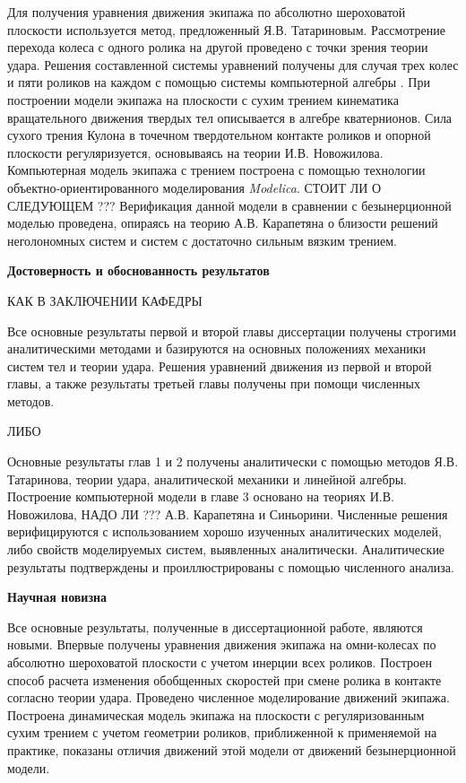 Для получения уравнения движения экипажа по абсолютно шероховатой плоскости используется метод, предложенный Я.В. Татариновым. Рассмотрение перехода колеса с одного ролика на другой проведено с точки зрения теории удара. Решения составленной системы уравнений получены для случая трех колес и пяти роликов на каждом с помощью системы компьютерной алгебры . При построении модели экипажа на плоскости с сухим трением кинематика вращательного движения твердых тел описывается в алгебре кватернионов. Сила сухого трения Кулона в точечном твердотельном контакте роликов и опорной плоскости регуляризуется, основываясь на теории И.В. Новожилова. Компьютерная модель экипажа с трением построена с помощью технологии объектно-ориентированного моделирования \textit{Modelica}. СТОИТ ЛИ О СЛЕДУЮЩЕМ ??? Верификация данной модели в сравнении с безынерционной моделью проведена, опираясь на теорию А.В. Карапетяна о близости решений неголономных систем и систем с достаточно сильным вязким трением.

\textbf{Достоверность и обоснованность результатов}

КАК В ЗАКЛЮЧЕНИИ КАФЕДРЫ

Все основные результаты первой и второй главы диссертации получены строгими аналитическими методами и базируются на основных положениях механики систем тел и теории удара. Решения уравнений движения из первой и второй главы, а также результаты третьей главы получены при помощи численных методов.

ЛИБО

Основные результаты глав 1 и 2 получены аналитически с помощью методов Я.В. Татаринова, теории удара, аналитической механики и линейной алгебры. Построение компьютерной модели в главе 3 основано на теориях И.В. Новожилова, НАДО ЛИ ??? А.В. Карапетяна и Синьорини. Численные решения верифицируются с использованием хорошо изученных аналитических моделей, либо свойств моделируемых систем, выявленных аналитически. Аналитические результаты подтверждены и проиллюстрированы с помощью численного анализа.

\textbf{Научная новизна}

Все основные результаты, полученные в диссертационной работе, являются новыми. Впервые получены уравнения движения экипажа на омни-колесах по абсолютно шероховатой плоскости с учетом инерции всех роликов. Построен способ расчета изменения обобщенных скоростей при смене ролика в контакте согласно теории удара. Проведено численное моделирование движений экипажа. Построена динамическая модель экипажа на плоскости с регуляризованным сухим трением с учетом геометрии роликов, приближенной к применяемой на практике, показаны отличия движений этой модели от движений безынерционной модели.

